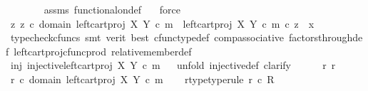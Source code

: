 \begin{isabellebody}
\ \ \ \ \ \ \isamarkupfalse%
\ assms\ functional{\isacharunderscore}{\kern0pt}on{\isacharunderscore}{\kern0pt}def\ \ \isamarkupfalse%
\ force\isanewline
\ \ \ \ \isamarkupfalse%
\ \isamarkupfalse%
\ {\isachardoublequoteopen}{\isasymexists}z{\isachardot}{\kern0pt}\ z\ {\isasymin}\isactrlsub c\ domain\ {\isacharparenleft}{\kern0pt}left{\isacharunderscore}{\kern0pt}cart{\isacharunderscore}{\kern0pt}proj\ X\ Y\ {\isasymcirc}\isactrlsub c\ m{\isacharparenright}{\kern0pt}\ {\isasymand}\ {\isacharparenleft}{\kern0pt}left{\isacharunderscore}{\kern0pt}cart{\isacharunderscore}{\kern0pt}proj\ X\ Y\ {\isasymcirc}\isactrlsub c\ m{\isacharparenright}{\kern0pt}\ {\isasymcirc}\isactrlsub c\ z\ {\isacharequal}{\kern0pt}\ x{\isachardoublequoteclose}\isanewline
\ \ \ \ \ \ \isamarkupfalse%
\ {\isacharparenleft}{\kern0pt}typecheck{\isacharunderscore}{\kern0pt}cfuncs{\isacharcomma}{\kern0pt}\ smt\ {\isacharparenleft}{\kern0pt}verit{\isacharcomma}{\kern0pt}\ best{\isacharparenright}{\kern0pt}\ cfunc{\isacharunderscore}{\kern0pt}type{\isacharunderscore}{\kern0pt}def\ comp{\isacharunderscore}{\kern0pt}associative\ factors{\isacharunderscore}{\kern0pt}through{\isacharunderscore}{\kern0pt}def{}\ left{\isacharunderscore}{\kern0pt}cart{\isacharunderscore}{\kern0pt}proj{\isacharunderscore}{\kern0pt}cfunc{\isacharunderscore}{\kern0pt}prod\ relative{\isacharunderscore}{\kern0pt}member{\isacharunderscore}{\kern0pt}def{}{\isacharparenright}{\kern0pt}\isanewline
\ \ \isamarkupfalse%
\isanewline
\ \ \isamarkupfalse%
\ inj{\isacharcolon}{\kern0pt}\ {\isachardoublequoteopen}injective{\isacharparenleft}{\kern0pt}left{\isacharunderscore}{\kern0pt}cart{\isacharunderscore}{\kern0pt}proj\ X\ Y\ {\isasymcirc}\isactrlsub c\ m{\isacharparenright}{\kern0pt}{\isachardoublequoteclose}\isanewline
\ \ \isamarkupfalse%
{\isacharparenleft}{\kern0pt}unfold\ injective{\isacharunderscore}{\kern0pt}def{\isacharcomma}{\kern0pt}\ clarify{\isacharparenright}{\kern0pt}\isanewline
\ \ \ \ \isamarkupfalse%
\ r{}\ r{}\ \isanewline
\ \ \ \ \isamarkupfalse%
\ {\isachardoublequoteopen}r{}\ {\isasymin}\isactrlsub c\ domain\ {\isacharparenleft}{\kern0pt}left{\isacharunderscore}{\kern0pt}cart{\isacharunderscore}{\kern0pt}proj\ X\ Y\ {\isasymcirc}\isactrlsub c\ m{\isacharparenright}{\kern0pt}{\isachardoublequoteclose}\ \isamarkupfalse%
\ \isamarkupfalse%
\ r{}{\isacharunderscore}{\kern0pt}type{\isacharbrackleft}{\kern0pt}type{\isacharunderscore}{\kern0pt}rule{\isacharbrackright}{\kern0pt}{\isacharcolon}{\kern0pt}\ {\isachardoublequoteopen}r{}\ {\isasymin}\isactrlsub c\ R{\isachardoublequoteclose}\isanewline

\end{isabellebody}
